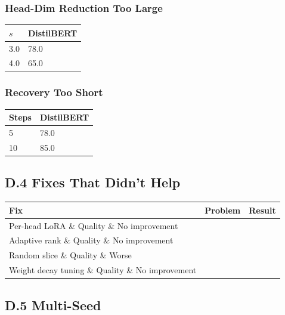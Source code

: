 \subsubsection{Head-Dim Reduction Too Large}
\begin{table}[H]
\centering
\small
\begin{tabular}{ll}
\toprule
\textbf{$s$} & \textbf{DistilBERT} \\
\midrule
3.0 & 78.0 \\
4.0 & 65.0 \\
\bottomrule
\end{tabular}
\end{table}

\subsubsection{Recovery Too Short}
\begin{table}[H]
\centering
\small
\begin{tabular}{ll}
\toprule
\textbf{Steps} & \textbf{DistilBERT} \\
\midrule
5 & 78.0 \\
10 & 85.0 \\
\bottomrule
\end{tabular}
\end{table}

\subsection{D.4 Fixes That Didn't Help}

\begin{table}[H]
\centering
\small
\begin{tabular}{lll}
\toprule
\textbf{Fix} & \textbf{Problem} & \textbf{Result} \\
\midrule
Per-head LoRA \& Quality \& No improvement \\
Adaptive rank \& Quality \& No improvement \\
Random slice \& Quality \& Worse \\
Weight decay tuning \& Quality \& No improvement \\
\bottomrule
\end{tabular}
\end{table}

\subsection{D.5 Multi-Seed}

